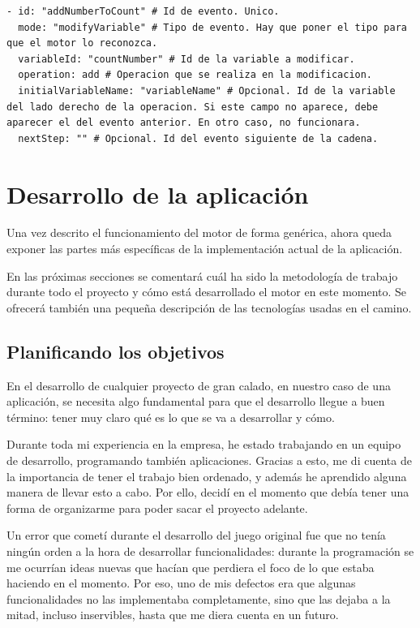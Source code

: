 \begin{lstlisting}
- id: "addNumberToCount" # Id de evento. Unico.
  mode: "modifyVariable" # Tipo de evento. Hay que poner el tipo para que el motor lo reconozca.
  variableId: "countNumber" # Id de la variable a modificar.
  operation: add # Operacion que se realiza en la modificacion.
  initialVariableName: "variableName" # Opcional. Id de la variable del lado derecho de la operacion. Si este campo no aparece, debe aparecer el del evento anterior. En otro caso, no funcionara.
  nextStep: "" # Opcional. Id del evento siguiente de la cadena.
\end{lstlisting}

\chapter{Desarrollo de la aplicación} \label{applicationImplementation}
Una vez descrito el funcionamiento del motor de forma genérica, ahora queda exponer las partes más específicas de la implementación actual de la aplicación.

En las próximas secciones se comentará cuál ha sido la metodología de trabajo durante todo el proyecto y cómo está desarrollado el motor en este momento. Se ofrecerá también una pequeña descripción de las tecnologías usadas en el camino.

\section{Planificando los objetivos}
En el desarrollo de cualquier proyecto de gran calado, en nuestro caso de una aplicación, se necesita algo fundamental para que el desarrollo llegue a buen término: tener muy claro qué es lo que se va a desarrollar y cómo.

Durante toda mi experiencia en la empresa, he estado trabajando en un equipo de desarrollo, programando también aplicaciones. Gracias a esto, me di cuenta de la importancia de tener el trabajo bien ordenado, y además he aprendido alguna manera de llevar esto a cabo. Por ello, decidí en el momento que debía tener una forma de organizarme para poder sacar el proyecto adelante.

Un error que cometí durante el desarrollo del juego original fue que no tenía ningún orden a la hora de desarrollar funcionalidades: durante la programación se me ocurrían ideas nuevas que hacían que perdiera el foco de lo que estaba haciendo en el momento. Por eso, uno de mis defectos era que algunas funcionalidades no las implementaba completamente, sino que las dejaba a la mitad, incluso inservibles, hasta que me diera cuenta en un futuro.

